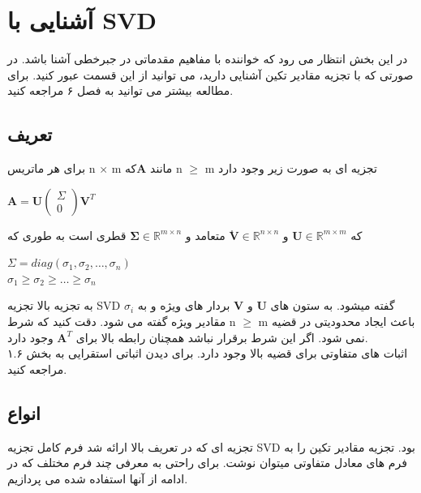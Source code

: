 	\section{آشنایی با SVD}
در این بخش انتظار می رود که خواننده با مفاهیم مقدماتی در جبرخطی آشنا باشد. در صورتی که با تجزیه مقادیر تکین آشنایی دارید،‌ می توانید از این قسمت عبور کنید. برای مطالعه بیشتر می توانید به فصل ۶ \cite{matrix_methods} مراجعه کنید.
	\subsection{تعریف}
	برای هر ماتریس n $ \times $ m مانند $\mathbf{A}$که n $ \geq $ m تجزیه ای به صورت زیر وجود دارد \\
	\begin{center}
		$ \mathbf{A} = \mathbf{U} \left( \begin{array}{c} \Sigma \\ 0 \end{array} \right)\mathbf{V}^T$
	\end{center}	
	که $ \mathbf{U} \in \mathbb{R}^{m \times m} $ و $ \mathbf{ٰV} \in \mathbb{R}^{n \times n} $ متعامد و $ \mathbf{\Sigma} \in \mathbb{R}^{m \times n} $ قطری است به طوری که
	
	\begin{center}
		$ \Sigma = diag(\sigma_{1}, \sigma_{2}, \ldots, \sigma_{n}) $
		\\
		$ \sigma_{1} \geq \sigma_{2}\geq \ldots\geq \sigma_{n} $
	\end{center}

	به تجزیه بالا تجزیه SVD  گفته میشود. به ستون های $\mathbf{U}$ و $\mathbf{V}$ بردار های ویژه  و به $\sigma_i$ مقادیر ویژه  گفته می شود. دقت کنید که شرط n $ \geq $ m باعث ایجاد محدودیتی در قضیه نمی شود. اگر این شرط برقرار نباشد همچنان رابطه بالا برای $\mathbf{A}^T$ وجود دارد.\\
	اثبات های متفاوتی برای قضیه بالا وجود دارد. برای دیدن اثباتی استقرایی به بخش ۱.۶ \cite{matrix_methods} مراجعه کنید.

	\pagebreak
	
	\subsection{انواع}
	تجزیه ای که در تعریف بالا ارائه شد فرم کامل  تجزیه SVD بود. تجزیه مقادیر تکین را به فرم های معادل متفاوتی میتوان نوشت. برای راحتی به معرفی چند فرم مختلف که در ادامه از آنها استفاده شده می پردازیم.
